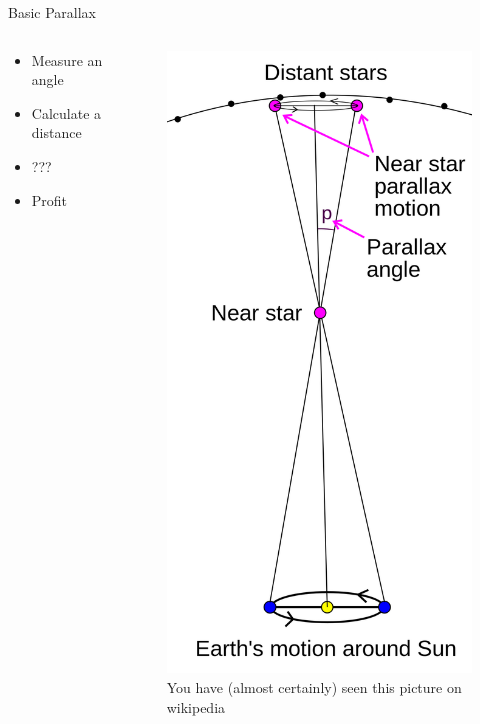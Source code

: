 \documentclass[hyperref={colorlinks = true, linkcolor=blue},8pt]{beamer}
\begin{document}
\begin{frame}{Basic Parallax}

\begin {columns}
	\Large
	\begin{column}{0.5\textwidth}
		\begin{itemize}
			\item Measure an angle
			\item Calculate a distance
			\item ???
			\item Profit
		\end{itemize}
	\end{column}
	\begin{column}{0.5\textwidth}
		\begin{figure}
			\includegraphics[width=0.6\columnwidth]{basicparallax.png}
			\caption{You have (almost certainly) seen this picture on wikipedia}
		\end{figure}
	\end{column}
\end{columns}

\end{frame}
\end{document}
